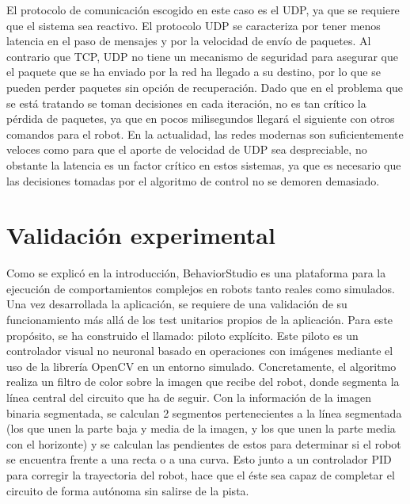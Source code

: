 El protocolo de comunicación escogido en este caso es el UDP, ya que se requiere que el sistema sea reactivo. El protocolo UDP se caracteriza por tener menos latencia en el paso de mensajes y por la velocidad de envío de paquetes. Al contrario que TCP, UDP no tiene un mecanismo de seguridad para asegurar que el paquete que se ha enviado por la red ha llegado a su destino, por lo que se pueden perder paquetes sin opción de recuperación. Dado que en el problema que se está tratando se toman decisiones en cada iteración, no es tan crítico la pérdida de paquetes, ya que en pocos milisegundos llegará el siguiente con otros comandos para el robot. En la actualidad, las redes modernas son suficientemente veloces como para que el aporte de velocidad de UDP sea despreciable, no obstante la latencia es un factor crítico en estos sistemas, ya que es necesario que las decisiones tomadas por el algoritmo de control no se demoren demasiado.

\section{Validación experimental}

Como se explicó en la introducción, BehaviorStudio es una plataforma para la ejecución de comportamientos complejos en robots tanto reales como simulados. Una vez desarrollada la aplicación, se requiere de una validación de su funcionamiento más allá de los test unitarios propios de la aplicación. Para este propósito, se ha construido el llamado: piloto explícito. Este piloto es un controlador visual no neuronal basado en operaciones con imágenes mediante el uso de la librería OpenCV en un entorno simulado. Concretamente, el algoritmo realiza un filtro de color sobre la imagen que recibe del robot, donde segmenta la línea central del circuito que ha de seguir. Con la información de la imagen binaria segmentada, se calculan 2 segmentos pertenecientes a la línea segmentada (los que unen la parte baja y media de la imagen, y los que unen la parte media con el horizonte) y se calculan las pendientes de estos para determinar si el robot se encuentra frente a una recta o a una curva. Esto junto a un controlador PID para corregir la trayectoria del robot, hace que el éste sea capaz de completar el circuito de forma autónoma sin salirse de la pista. 

